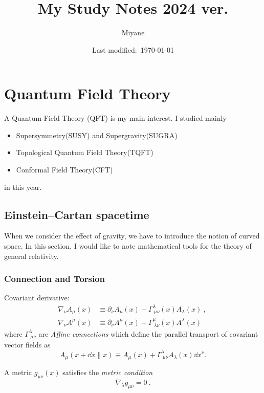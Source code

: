 \documentclass[a4paper,pdftex,draft]{report}
\title{My Study Notes 2024 ver.}
\author{Miyane}
\date{Last modified:\ \today}
\begin{document}
\maketitle

\tableofcontents

\clearpage

\chapter{Quantum Field Theory}

A Quantum Field Theory (QFT) is my main interest. I studied mainly
\begin{itemize}
  \item 
  Supersymmetry(SUSY) and Supergravity(SUGRA)
  \item 
  Topological Quantum Field Theory(TQFT)
  \item 
  Conformal Field Theory(CFT)
\end{itemize}
in this year.

\section{Einstein–Cartan spacetime}

When we consider the effect of gravity, we have to introduce the notion of curved space. In this section, I would like to note mathematical tools for the theory of general relativity.

\subsection{Connection and  Torsion}

Covariant derivative:
\begin{align}
  \nabla_{\nu}A_{\mu}(x)
  &\equiv
  \partial_{\nu}A_{\mu}(x)
  -
  \Gamma^{\lambda}_{\ \mu\nu}(x)A_{\lambda}(x)
  \ ,\ 
  \\
  \nabla_{\nu}A^{\mu}(x)
  &\equiv
  \partial_{\nu}A^{\mu}(x)
  +
  \Gamma^{\mu}_{\ \lambda\nu}(x)A^{\lambda}(x)
\end{align}
where $\Gamma^{\lambda}_{\ \mu\nu}$ are \textit{Affine connections} which define the parallel transport of covariant vector fields as
\begin{equation}
  A_{\mu}(x+\dd x \parallel x)
  \equiv
  A_{\mu}(x)
  +
  \Gamma^{\lambda}_{\ \mu\nu}A_{\lambda}(x)\dd x^{\nu}
  .
\end{equation}

A metric $g_{\mu\nu}(x)$ satisfies the \textit{metric condition}
\begin{equation}
  \nabla_{\lambda}g_{\mu\nu}
  =
  0
  \ .
\end{equation}
\end{document}
